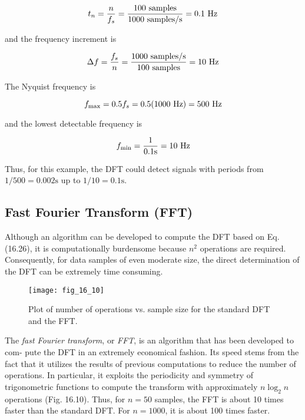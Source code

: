 \documentclass[../main.tex]{subfiles}
\begin{document}
\begin{equation}
	\notag
	t_n = \frac{n}{f_s} = \frac{100 \text{ samples}}{1000 \text{ samples/s}}=0.1 \text{ Hz}
\end{equation}

\noindent and the frequency increment is

\begin{equation}
	\notag
	\Delta f = \frac{f_s}{n} = \frac{1000 \text{ samples/s}}{100 \text{ samples}}=10 \text{ Hz}
\end{equation}

\noindent The Nyquist frequency is

\begin{equation}
	\notag
	f_{\text{max}} = 0.5 f_s = 0.5 (1000 \text{ Hz}) = 500 \text{ Hz}
\end{equation}

\noindent and the lowest detectable frequency is

\begin{equation}
	\notag
	f_{\text{min}} = \frac{1}{0.1 \text{s}} = 10 \text{ Hz}
\end{equation}

\noindent Thus, for this example, the DFT could detect signals with periods from $1/500 = 0.002 \text{s}$ up
to $1/10 = 0.1\text{s}$.

\label{cha:cha_P_16_5_1} %
\subsection{Fast Fourier Transform (FFT)}

\noindent Although an algorithm can be developed to compute the DFT based on Eq. (16.26), it is
computationally burdensome because $n^2$ operations are required. Consequently, for data
samples of even moderate size, the direct determination of the DFT can be extremely time
consuming.

\begin{figure}[H] 
	\centering
	\texttt{[image: fig\_16\_10]}
	\caption{\textsf{Plot of number of operations vs. sample size for the standard DFT and the FFT.}}
	\label{fig:fig_16_10}
\end{figure}

The \textit{fast Fourier transform}, or \textit{FFT}, is an algorithm that has been developed to com-
pute the DFT in an extremely economical fashion. Its speed stems from the fact that it
utilizes the results of previous computations to reduce the number of operations. In particular, it exploits the periodicity and symmetry of trigonometric functions to compute
the transform with approximately $n \log_2n$ operations (Fig. 16.10). Thus, for $n = 50$ samples, the FFT is about 10 times faster than the standard DFT. For $n = 1000$, it is about
100 times faster.
\end{document}
